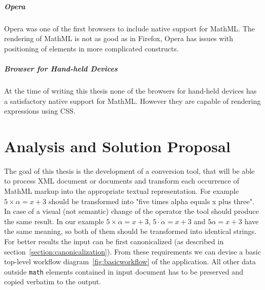 \documentclass[11pt,oneside,final]{fithesis2}
\begin{document}
\paragraph*{Opera}
Opera was one of the first browsers to include native support for MathML. The rendering of MathML is not as good as in Firefox, Opera has issues with positioning of elements in more complicated constructs. 

\paragraph*{Browser for Hand-held Devices}
At the time of writing this thesis none of the browsers for hand-held devices has a satisfactory native support for MathML. However they are capable of rendering expressions using CSS.


\chapter{Analysis and Solution Proposal}
The goal of this thesis is the development of a conversion tool, that will be able to process XML document or documents and transform each occurrence of MathML markup into the appropriate textual representation. For example $5 \times \alpha = x + 3$ should be transformed into "five times alpha equals x plus three". In case of a visual (not semantic) change of the operator the tool should produce the same result. In our example $5 \times \alpha = x + 3$, $5 \cdot \alpha = x + 3$ and $5\alpha = x + 3$ have the same meaning, so both of them should be transformed into identical strings. For better results the input can be first canonicalized (as described in section~\ref{section:canonicalization}). From these requirements we can devise a basic top-level workflow diagram~\ref{fig:basicworkflow} of the application. All other data outside \texttt{math} elements contained in input document has to be preserved and copied verbatim to the output.
\end{document}
